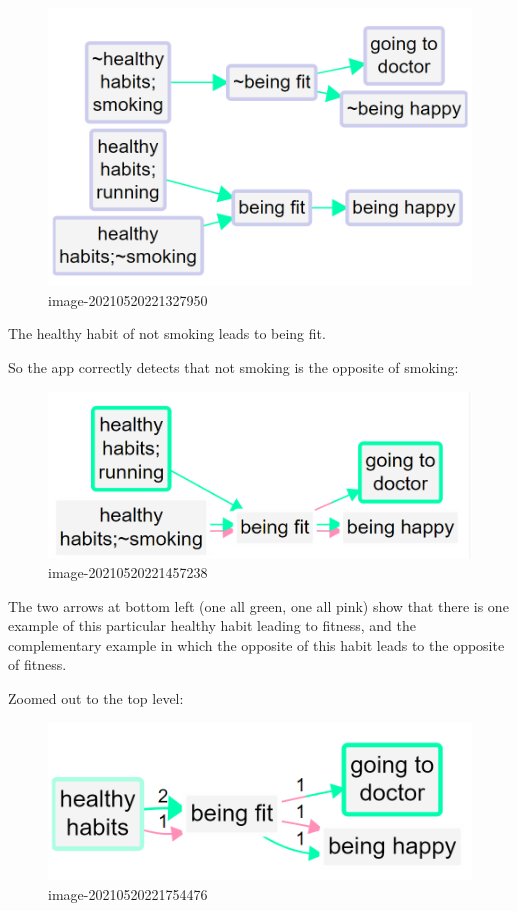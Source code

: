 \documentclass[
]{book}
\begin{document}
\begin{figure}
\centering
\includegraphics{_assets/image-20210520221327950.png}
\caption{image-20210520221327950}
\end{figure}

The healthy habit of not smoking leads to being fit.

So the app correctly detects that not smoking is the opposite of smoking:

\begin{figure}
\centering
\includegraphics{_assets/image-20210520221457238.png}
\caption{image-20210520221457238}
\end{figure}

The two arrows at bottom left (one all green, one all pink) show that there is one example of this particular healthy habit leading to fitness, and the complementary example in which the opposite of this habit leads to the opposite of fitness.

Zoomed out to the top level:

\begin{figure}
\centering
\includegraphics{_assets/image-20210520221754476.png}
\caption{image-20210520221754476}
\end{figure}
\end{document}
